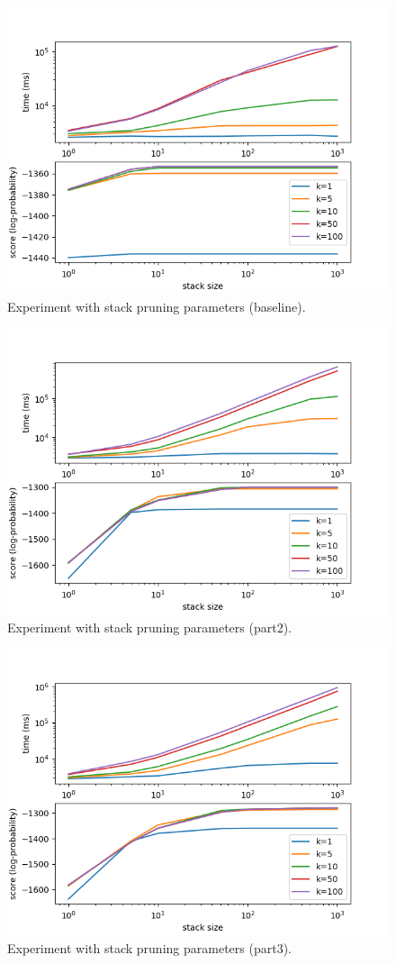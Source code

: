 \documentclass[answers]{exam}
\begin{document}
\begin{figure}
  \centering
  \includegraphics{fig-default}
  \caption[Experiment (baseline).]{Experiment with stack pruning parameters
    (baseline).}
  \label{fig:exp-baseline}
\end{figure}

\begin{figure}
  \centering
  \includegraphics{fig-part2}
  \caption[Experiment (baseline).]{Experiment with stack pruning parameters
    (part2).}
  \label{fig:exp-part2}
\end{figure}

\begin{figure}
  \centering
  \includegraphics{fig-part3}
  \caption[Experiment (baseline).]{Experiment with stack pruning parameters
    (part3).}
  \label{fig:exp-part3}
\end{figure}
\end{document}
